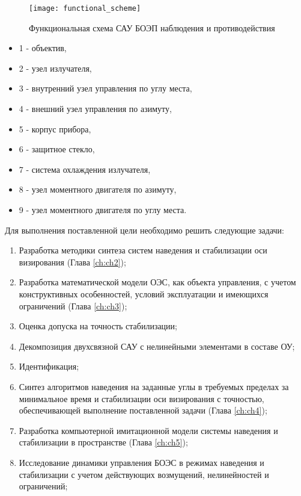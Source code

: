 \begin{figure}[ht]
	\centering
	\texttt{[image: functional\_scheme]} 
	\caption{Функциональная схема САУ БОЭП наблюдения и противодействия}
	\label{fig:functional_scheme}
\end{figure}

\begin{itemize}
	\item 1 - объектив,
	\item 2 - узел излучателя,
	\item 3 - внутренний узел управления по углу места,
	\item 4 - внешний узел управления по азимуту,
	\item 5 - корпус прибора,
	\item 6 - защитное стекло,
	\item 7 - система охлаждения излучателя,
	\item 8 - узел моментного двигателя по азимуту,
	\item 9 - узел моментного двигателя по углу места.
\end{itemize}

Для выполнения поставленной цели необходимо решить следующие задачи:

\begin{enumerate}
	\item Разработка методики синтеза систем наведения и стабилизации оси визирования (Глава \ref{ch:ch2});
	\item Разработка математической модели ОЭС, как объекта управления, с учетом конструктивных особенностей, условий эксплуатации и имеющихся ограничений (Глава \ref{ch:ch3});
	\item Оценка допуска на точность стабилизации;
	\item Декомпозиция двухсвязной САУ с нелинейными элементами в составе ОУ;
	\item Идентификация;
	\item Синтез алгоритмов наведения на заданные углы в требуемых пределах за минимальное время и стабилизации оси визирования с точностью, обеспечивающей выполнение поставленной задачи (Глава \ref{ch:ch4});
	\item Разработка компьютерной имитационной модели системы наведения и стабилизации в пространстве (Глава \ref{ch:ch5});
	\item Исследование динамики управления БОЭС в режимах наведения и стабилизации с учетом действующих возмущений, нелинейностей и ограничений;
\end{enumerate}

\clearpage